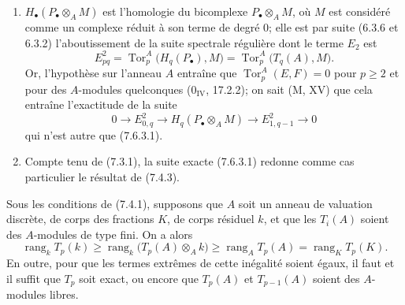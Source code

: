 \begin{remarks}[7.6.4]
\begin{enumerate}
  \item[(i)] $H_\bullet(P_\bullet\otimes_A M)$ est l'homologie du bicomplexe
    $P_\bullet\otimes_A M$, où $M$ est considéré comme un complexe réduit à son
    terme de degré 0; elle est par suite (6.3.6 et 6.3.2) l'aboutissement de la
    suite spectrale régulière dont le terme $E_2$ est
    \[
      E^2_{pq}
      =
      \operatorname{Tor}_p^A\bigl(H_q(P_\bullet),M\bigr)
      =
      \operatorname{Tor}_p^A\bigl(T_q(A),M\bigr).
    \]
    Or, l'hypothèse sur l'anneau $A$ entraîne que
    $\operatorname{Tor}_p^A(E,F)=0$ pour $p\geq2$ et pour des $A$-modules
    quelconques ($0_{\mathrm{IV}}$, 17.2.2); on sait (M, XV) que cela entraîne
    l'exactitude de la suite
    \[
      0\longrightarrow E^2_{0,q}
      \longrightarrow H_q(P_\bullet\otimes_A M)
      \longrightarrow E^2_{1,q-1}
      \longrightarrow0
    \]
    qui n'est autre que (7.6.3.1).
  \item[(ii)] Compte tenu de (7.3.1), la suite exacte (7.6.3.1) redonne comme
    cas particulier le résultat de (7.4.3).
\end{enumerate}
\end{remarks}

\begin{corollary}[7.6.5]
Sous les conditions de (7.4.1), supposons que $A$ soit un anneau de valuation
discrète, de corps des fractions $K$, de corps résiduel $k$, et que les $T_i(A)$
soient des $A$-modules de type fini. On a alors
\[
  \operatorname{rang}_k T_p(k)
  \geq
  \operatorname{rang}_k\bigl(T_p(A)\otimes_A k\bigr)
  \geq
  \operatorname{rang}_A T_p(A)
  =
  \operatorname{rang}_K T_p(K).
  \tag{7.6.5.1}\label{III.7.6.5.1.fr}
\]
En outre, pour que les termes extrêmes de cette inégalité soient égaux, il faut
et il suffit que $T_p$ soit exact, ou encore que $T_p(A)$ et $T_{p-1}(A)$ soient
des $A$-modules libres.
\end{corollary}

